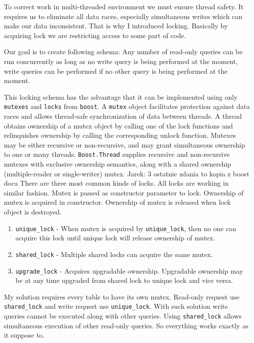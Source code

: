 \documentclass[10pt,a4paper]{article}
\newcommand{\jarek}[1]{\noindent\colorbox{myYellow}{Jarek: #1}}
\begin{document}
To correct work in multi-threaded environment we must ensure thread safety. It requires us to eliminate all data races, especially simultaneous writes which can make our data inconsistent. That is why I introduced locking. Basically by acquiring lock we are restricting access to some part of code. 

Our goal is to create following schema: Any number of read-only queries can be run concurrently as long as no write query is being performed at the moment, write queries can be performed if no other query is being performed at the moment. 

This locking schema has the advantage that it can be implemented using only \verb|mutexes| and \verb|locks| from \verb|boost|. A \verb|mutex| object facilitates protection against data races and allows thread-safe synchronization of data between threads. A thread obtains ownership of a mutex object by calling one of the lock functions and relinquishes ownership by calling the corresponding unlock function. Mutexes may be either recursive or non-recursive, and may grant simultaneous ownership to one or many threads. \verb|Boost.Thread| supplies recursive and non-recursive mutexes with exclusive ownership semantics, along with a shared ownership (multiple-reader or single-writer) mutex. \jarek{3 ostatnie zdania to kopia z boost doca}
There are three most common kinds of locks. All locks are working in similar fashion. Mutex is passed as constructor parameter to lock. Ownership of mutex is acquired in constructor. Ownership of mutex is released when lock object is destroyed.  

\begin{enumerate}
\item \verb|unique_lock| - When mutex is acquired by \verb|unique_lock|, then no one can acquire this lock until unique lock will release ownership of mutex. 
\item \verb|shared_lock| - Multiple shared locks can acquire the same mutex.
\item \verb|upgrade_lock| - Acquires upgradable ownership. Upgradable ownership may be at any time upgraded from shared lock to unique lock and vice versa.
\end{enumerate}

My solution requires every table to have its own mutex. Read-only request use \verb|shared_lock| and write request use \verb|unique_lock|. With such solution write queries cannot be executed along with other queries. Using \verb|shared_lock| allows simultaneous execution of other read-only queries. So everything works exactly as it suppose to.
\end{document}
